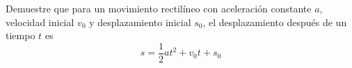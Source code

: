 \item Demuestre que para un movimiento rectilíneo con aceleración constante $a$, velocidad inicial $v_0$ y desplazamiento inicial $s_0$, el desplazamiento después de un tiempo $t$ es $$s = \frac{1}{2}at^2 + v_0t + s_0$$
